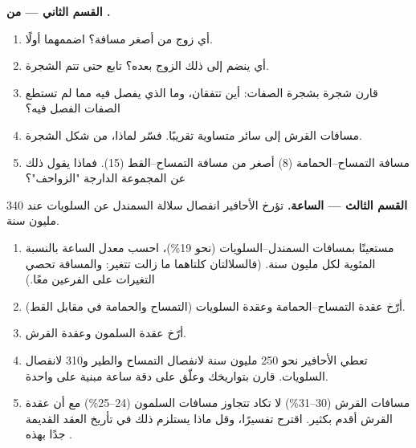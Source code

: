 \begin{problem}
\medskip
\noindent\textbf{القسم الثاني --- من .}
\begin{enumerate}[resume]
  \item أي زوج من  أصغر مسافة؟ اضممهما أولًا.
  \item أي  ينضم إلى ذلك الزوج بعده؟ تابع حتى تتم الشجرة.
  \item قارن شجرة  بشجرة الصفات: أين تتفقان، وما الذي يفصل فيه 
        مما لم تستطع الصفات الفصل فيه؟
  \item مسافات القرش إلى سائر  متساوية تقريبًا. فسّر لماذا، من
        شكل الشجرة.
  \item مسافة التمساح--الحمامة (8) أصغر من مسافة التمساح--القط (15).
        فماذا يقول ذلك عن المجموعة الدارجة "الزواحف"؟
\end{enumerate}

\medskip
\noindent\textbf{القسم الثالث --- الساعة.}
تؤرخ الأحافير انفصال سلالة السمندل عن السلويات عند 340 مليون سنة.
\begin{enumerate}[resume]
  \item مستعينًا بمسافات السمندل--السلويات (نحو 19\%)، احسب معدل
        الساعة بالنسبة المئوية لكل مليون سنة. (فالسلالتان كلتاهما ما
        زالت تتغير: والمسافة تحصي التغيرات على الفرعين معًا.)
  \item أرّخ عقدة التمساح--الحمامة وعقدة السلويات (التمساح والحمامة في
        مقابل القط).
  \item أرّخ عقدة السلمون وعقدة القرش.
  \item تعطي الأحافير نحو 250 مليون سنة لانفصال التمساح والطير و310
        لانفصال السلويات. قارن بتواريخك وعلّق على دقة ساعة مبنية على
         واحدة.
  \item مسافات القرش (30--31\%) لا تكاد تتجاوز مسافات السلمون
        (24--25\%) مع أن عقدة القرش أقدم بكثير. اقترح تفسيرًا، وقل ماذا
        يستلزم ذلك في تأريخ العقد القديمة جدًا بهذه .
\end{enumerate}


\end{problem}

